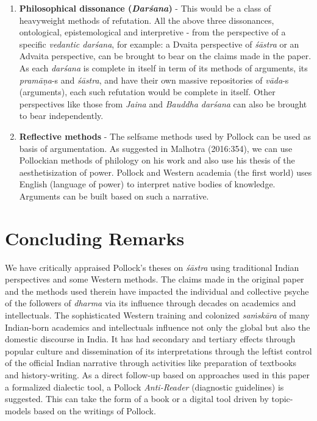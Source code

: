\begin{enumerate}
\item {\bf Philosophical dissonance ({{\sl\bfseries Darśana}\relax})} - This would be a class of heavyweight methods of refutation. All the above three dissonances, ontological, epistemological and interpretive - from the perspective of a specific {\sl vedantic darśana}, for example: a Dvaita perspective of {\sl śāstra} or an Advaita perspective, can be brought to bear on the claims made in the paper. As each {\sl darśana} is complete in itself in term of its methods of arguments, its {\sl pramāṇa}-s and {\sl śāstra}, and have their own massive repositories of {\sl vāda}-s (arguments), each such refutation would be complete in itself. Other perspectives like those from {\sl Jaina} and {\sl Bauddha darśana} can also be brought to bear independently.

\item {\bf Reflective methods} - The selfsame methods used by Pollock can be used as basis of argumentation. As suggested in Malhotra (2016:354), we can use Pollockian methods of philology on his work and also use his thesis of the aesthetisization of power. Pollock and Western academia (the first world) uses English (language of power) to interpret native bodies of knowledge. Arguments can be built based on such a narrative.
\end{enumerate}

\medskip

\section*{Concluding Remarks}

We have critically appraised Pollock's theses on {\sl śāstra} using traditional Indian perspectives and some Western methods. The claims made in the original paper and the methods used therein have impacted the individual and collective psyche of the followers of {\sl dharma} via its influence through decades on academics and intellectuals. The sophisticated Western training and colonized {\sl saṁskāra} of many Indian-born academics and intellectuals influence not only the global but also the domestic discourse in India. It has had secondary and tertiary effects through popular culture and dissemination of its interpretations through the leftist control of the official Indian narrative through activities like preparation of textbooks and history-writing. As a direct follow-up based on approaches used in this paper a formalized dialectic tool, a Pollock {\sl Anti-Reader} (diagnostic guidelines) is suggested. This can take the form of a book or a digital tool driven by topic-models based on the writings of Pollock.

